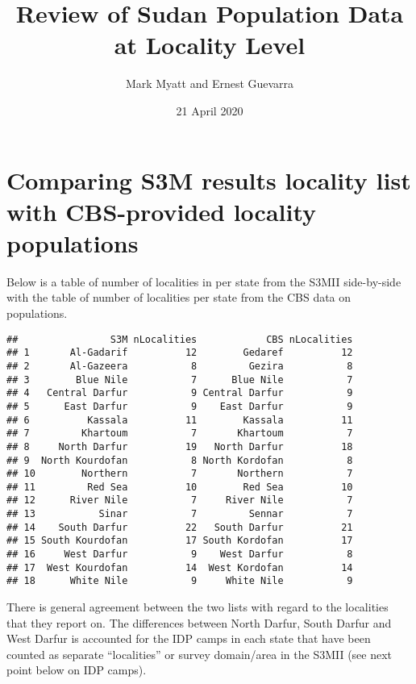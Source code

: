 \documentclass[12pt,a4paper]{article}
\title{\vspace{8cm} \LARGE{Review of Sudan Population Data at Locality Level}}
\author{Mark Myatt and Ernest Guevarra}
\date{21 April 2020}
\begin{document}
\maketitle

\newpage

\newpage

\hypertarget{comparing-s3m-results-locality-list-with-cbs-provided-locality-populations}{%
\section{Comparing S3M results locality list with CBS-provided locality populations}\label{comparing-s3m-results-locality-list-with-cbs-provided-locality-populations}}

Below is a table of number of localities in per state from the S3MII side-by-side with the table of number of localities per state from the CBS data on populations.

\begin{verbatim}
##                S3M nLocalities            CBS nLocalities
## 1       Al-Gadarif          12        Gedaref          12
## 2       Al-Gazeera           8         Gezira           8
## 3        Blue Nile           7      Blue Nile           7
## 4   Central Darfur           9 Central Darfur           9
## 5      East Darfur           9    East Darfur           9
## 6          Kassala          11        Kassala          11
## 7         Khartoum           7       Khartoum           7
## 8     North Darfur          19   North Darfur          18
## 9  North Kourdofan           8 North Kordofan           8
## 10        Northern           7       Northern           7
## 11         Red Sea          10        Red Sea          10
## 12      River Nile           7     River Nile           7
## 13           Sinar           7         Sennar           7
## 14    South Darfur          22   South Darfur          21
## 15 South Kourdofan          17 South Kordofan          17
## 16     West Darfur           9    West Darfur           8
## 17  West Kourdofan          14  West Kordofan          14
## 18      White Nile           9     White Nile           9
\end{verbatim}

There is general agreement between the two lists with regard to the localities that they report on. The differences between North Darfur, South Darfur and West Darfur is accounted for the IDP camps in each state that have been counted as separate ``localities'' or survey domain/area in the S3MII (see next point below on IDP camps).
\end{document}
